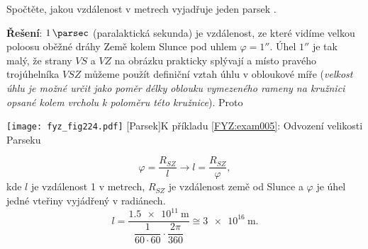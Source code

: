 \wikitextrule
\begin{example}\label{FYZ:exam005}
  Spočtěte, jakou vzdálenost v metrech vyjadřuje jeden parsek \protect\cite[s.~3]{Kulhanek2009}.
  
  \textbf{Řešení}: \(\SI{1}{\parsec}\) (paralaktická sekunda) je vzdálenost, ze které vidíme 
  velkou poloosu oběžné dráhy Země kolem Slunce pod uhlem \(\varphi = \ang{;;1}\). Úhel 
  \(\ang{;;1}\) je tak malý, že strany \(VS\) a \(VZ\) na obrázku prakticky splývají a místo 
  pravého trojúhelníka $VSZ$ můžeme použít definiční vztah úhlu v obloukové míře (\emph{velkost 
  úhlu je možné určit jako poměr délky oblouku vymezeného rameny na kružnici opsané kolem 
  vrcholu k poloměru této kružnice}). Proto 
  
   {\centering
    \captionsetup{type=figure}
    \texttt{[image: fyz\_fig224.pdf]}
    [Parsek]{K příkladu \ref{FYZ:exam005}: Odvození velikosti Parseku}
    \label{fyz:fig224}
    \par}
  \begin{equation*}
    \varphi = \frac{R_{SZ}}{l} \rightarrow l = \frac{R_{SZ}}{\varphi},
  \end{equation*}
  kde $l$ je vzdálenost \SI{1}{\parsec} v metrech, $R_{SZ}$ je vzdálenost země od Slunce a 
  $\varphi$ je úhel jedné vteřiny vyjádřený v radiánech. 
  \begin{equation*}
      l = \frac{\SI{1.5e11}{\meter}}{\dfrac{1}{60\cdot60} 
          \cdot\dfrac{2\pi}{360}}\cong \SI{3e16}{\meter}.
  \end{equation*}
\end{example}
\wikitextrule